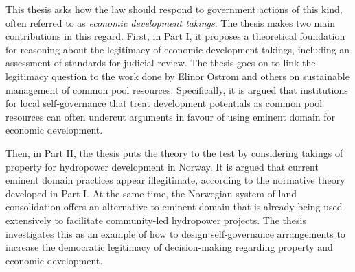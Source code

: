 \begin{quoting}
This thesis asks how the law should respond to government actions of this kind, often referred to as {\it economic development takings}. The thesis makes two main contributions in this regard. First, in Part I, it proposes a theoretical foundation for reasoning about the legitimacy of economic development takings, including an assessment of standards for judicial review. The thesis goes on to link the legitimacy question to the work done by Elinor Ostrom and others on sustainable management of common pool resources. Specifically, it is argued that institutions for local self-governance that treat development potentials as common pool resources can often undercut arguments in favour of using eminent domain for economic development.

Then, in Part II, the thesis puts the theory to the test by considering takings of property for hydropower development in Norway. It is argued that current eminent domain practices appear illegitimate, according to the normative theory developed in Part I. At the same time, the Norwegian system of land consolidation offers an alternative to eminent domain that is already being used extensively to facilitate community-led hydropower projects. The thesis investigates this as an example of how to design self-governance arrangements to increase the democratic legitimacy of decision-making regarding property and economic development.





\end{quoting}
